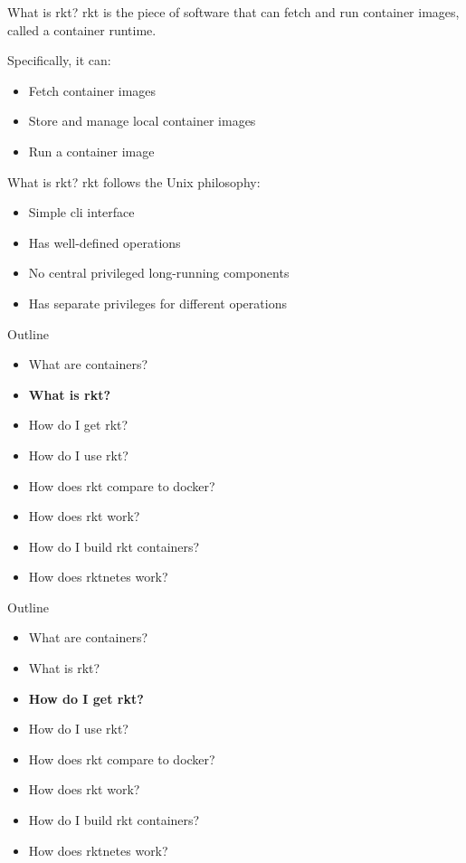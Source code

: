 \documentclass[pdf,aspectratio=169,14pt]{beamer}
\begin{document}
\begin{frame}{What is rkt?}
    rkt is the piece of software that can fetch and run container images,
    called a container runtime.

    Specifically, it can:
    \begin{itemize}
        \pause
        \item Fetch container images
        \pause
        \item Store and manage local container images
        \pause
        \item Run a container image
    \end{itemize}
\end{frame}

\begin{frame}{What is rkt?}
    rkt follows the Unix philosophy:
    \begin{itemize}
        \pause
        \item Simple cli interface
        \pause
        \item Has well-defined operations
        \pause
        \item No central privileged long-running components
        \pause
        \item Has separate privileges for different operations
    \end{itemize}
\end{frame}


\begin{frame}
    Outline
    \begin{itemize}
        \item What are containers?
        \item \textbf{What is rkt?}
        \item How do I get rkt?
        \item How do I use rkt?
        \item How does rkt compare to docker?
        \item How does rkt work?
        \item How do I build rkt containers?
        \item How does rktnetes work?
    \end{itemize}
\end{frame}

\begin{frame}
    Outline
    \begin{itemize}
        \item What are containers?
        \item What is rkt?
        \item \textbf{How do I get rkt?}
        \item How do I use rkt?
        \item How does rkt compare to docker?
        \item How does rkt work?
        \item How do I build rkt containers?
        \item How does rktnetes work?
    \end{itemize}
\end{frame}
\end{document}
